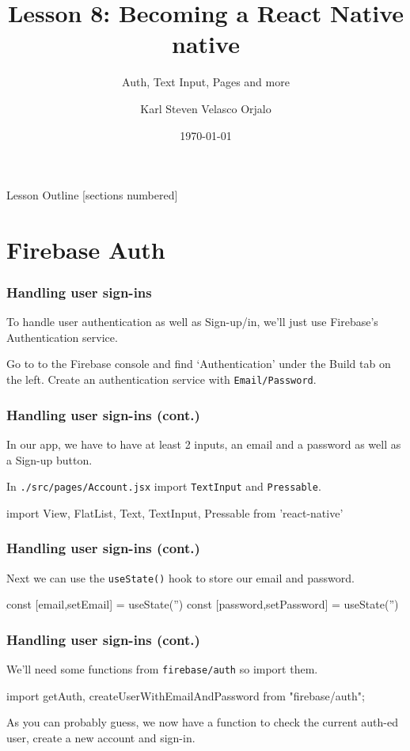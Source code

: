 \documentclass{beamer}
\title{Lesson 8: Becoming a React Native native}
\subtitle{Auth, Text Input, Pages and more}
\date{\today}
\author{Karl Steven Velasco Orjalo}
\institute{React Native Quickstart}
\begin{document}
  \maketitle

  \begin{frame}{Lesson Outline}
    [sections numbered]
    \tableofcontents
  \end{frame}

  \section{Firebase Auth}
  \begin{frame}[fragile]
    \frametitle{Handling user sign-ins}
    To handle user authentication as well as Sign-up/in, we'll just use Firebase's Authentication service. 

    Go to to the Firebase console and find `Authentication' under the Build tab on the left. 
    Create an authentication service with \verb|Email/Password|.
  \end{frame}
  \begin{frame}[fragile]
    \frametitle{Handling user sign-ins (cont.)}
    In our app, we have to have at least 2 inputs, an email and a password as well as a Sign-up button. 

    In \verb|./src/pages/Account.jsx| import \verb|TextInput| and \verb|Pressable|. 

    \begin{jscodesmall}
import { View, FlatList, Text, TextInput, Pressable } from 'react-native'
    \end{jscodesmall}
  \end{frame}
  \begin{frame}[fragile]
    \frametitle{Handling user sign-ins (cont.)}
    Next we can use the \verb|useState()| hook to store our email and password. 

    \begin{jscodesmall}
const [email,setEmail] = useState('')
const [password,setPassword] = useState('')
    \end{jscodesmall}
  \end{frame}
  \begin{frame}[fragile]
    \frametitle{Handling user sign-ins (cont.)}
    We'll need some functions from \verb|firebase/auth| so import them. 

    \begin{jscodesmall}
import { getAuth, createUserWithEmailAndPassword } from "firebase/auth";
    \end{jscodesmall}

    As you can probably guess, we now have a function to check the current auth-ed user, create a new account and sign-in. 
  \end{frame}
\end{document}
